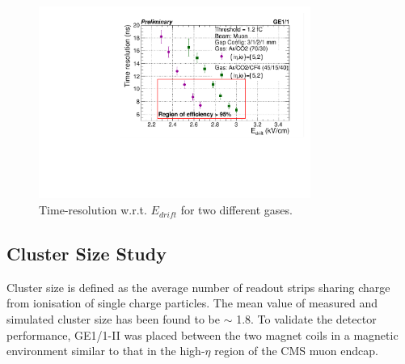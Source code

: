 \begin{figure}[!htbp]
\centering
\includegraphics[width=3.5in]{figures/GEM/TimeResolution_wrt_EDrift.pdf}
\caption{Time-resolution w.r.t. $E_{drift}$ for two different gases.}
\label{TimeResolution}
\end{figure}



% 

\subsection{Cluster Size Study}

Cluster size is defined as the average number of readout strips sharing charge from ionisation of single charge particles. The mean value of measured and simulated cluster size has been found to be $\sim$ 1.8. To validate the detector performance, GE1/1-II was placed between the two magnet coils in a magnetic environment similar to that in the high-$\eta$ region of the CMS muon endcap.


